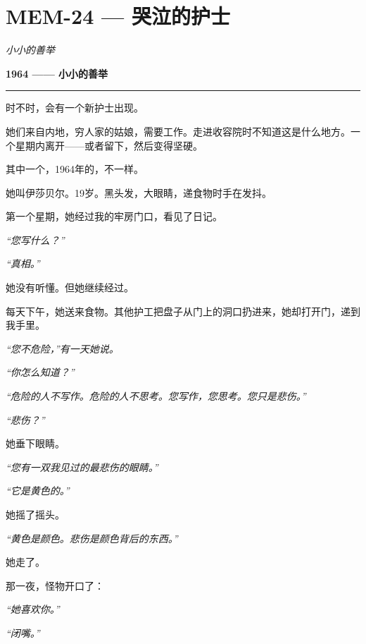 \section*{\textbf{MEM-24} --- 哭泣的护士}

\noindent \textit{小小的善举}

\noindent \textbf{1964 —— 小小的善举}

\vspace{0.5em}\noindent\rule{\textwidth}{0.5pt}\vspace{0.5em}

\noindent 时不时，会有一个新护士出现。

\noindent 她们来自内地，穷人家的姑娘，需要工作。走进收容院时不知道这是什么地方。一个星期内离开——或者留下，然后变得坚硬。

\noindent 其中一个，1964年的，不一样。

\noindent 她叫伊莎贝尔。19岁。黑头发，大眼睛，递食物时手在发抖。

\noindent 第一个星期，她经过我的牢房门口，看见了日记。

\noindent \textit{“您写什么？”}

\noindent \textit{“真相。”}

\noindent 她没有听懂。但她继续经过。

\noindent 每天下午，她送来食物。其他护工把盘子从门上的洞口扔进来，她却打开门，递到我手里。

\noindent \textit{“您不危险，”有一天她说。}

\noindent \textit{“你怎么知道？”}

\noindent \textit{“危险的人不写作。危险的人不思考。您写作，您思考。您只是悲伤。”}

\noindent \textit{“悲伤？”}

\noindent 她垂下眼睛。

\noindent \textit{“您有一双我见过的最悲伤的眼睛。”}

\noindent \textit{“它是黄色的。”}

\noindent 她摇了摇头。

\noindent \textit{“黄色是颜色。悲伤是颜色背后的东西。”}

\noindent 她走了。

\noindent 那一夜，怪物开口了：

\noindent \textit{“她喜欢你。”}

\noindent \textit{“闭嘴。”}

